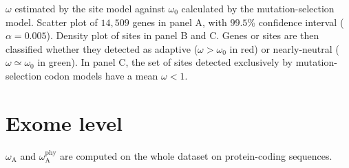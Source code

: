 \documentclass{article}
\begin{document}
    $\omega$ estimated by the site model against $\omega_{0}$ calculated by the mutation-selection model.
    Scatter plot of $14,509$ genes in panel A, with $99.5$\% confidence interval ($\alpha=0.005$).
    Density plot of sites in panel B and C.
    Genes or sites are then classified whether they detected as adaptive ($\omega > \omega_{0}$ in red) or nearly-neutral ($\omega \simeq \omega_{0}$ in green).
    In panel C, the set of sites detected exclusively by mutation-selection codon models have a mean $\omega < 1 $.

    


    \section{Exome level}
    $\omega_{\mathrm{A}}$ and $\omega_{\mathrm{A}}^{\mathrm{phy}}$ are computed on the whole dataset on protein-coding sequences.
\end{document}
